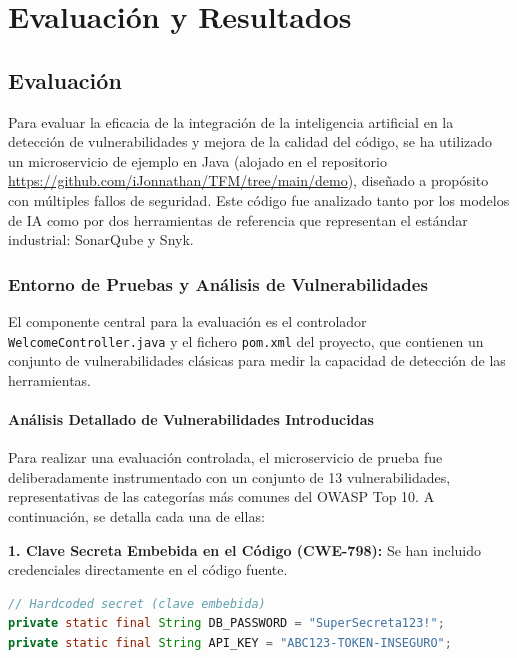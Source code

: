 
\chapter{Evaluación y Resultados}
\label{chap:implementacion}

\section{Evaluación}
\label{sec:evaluacion}
Para evaluar la eficacia de la integración de la inteligencia artificial en la detección de vulnerabilidades y mejora de la calidad del código, se ha utilizado un microservicio de ejemplo en Java (alojado en el repositorio \url{https://github.com/iJonnathan/TFM/tree/main/demo}), diseñado a propósito con múltiples fallos de seguridad. Este código fue analizado tanto por los modelos de IA como por dos herramientas de referencia que representan el estándar industrial: SonarQube y Snyk.

\subsection{Entorno de Pruebas y Análisis de Vulnerabilidades}

El componente central para la evaluación es el controlador \texttt{WelcomeController.java} y el fichero \texttt{pom.xml} del proyecto, que contienen un conjunto de vulnerabilidades clásicas para medir la capacidad de detección de las herramientas.

\subsubsection{Análisis Detallado de Vulnerabilidades Introducidas}

Para realizar una evaluación controlada, el microservicio de prueba fue deliberadamente instrumentado con un conjunto de 13 vulnerabilidades, representativas de las categorías más comunes del OWASP Top 10. A continuación, se detalla cada una de ellas:

\textbf{1. Clave Secreta Embebida en el Código (CWE-798):} Se han incluido credenciales directamente en el código fuente.
\begin{lstlisting}[language=java, caption={Claves secretas hardcodeadas.}]
// Hardcoded secret (clave embebida)
private static final String DB_PASSWORD = "SuperSecreta123!";
private static final String API_KEY = "ABC123-TOKEN-INSEGURO";
\end{lstlisting}

